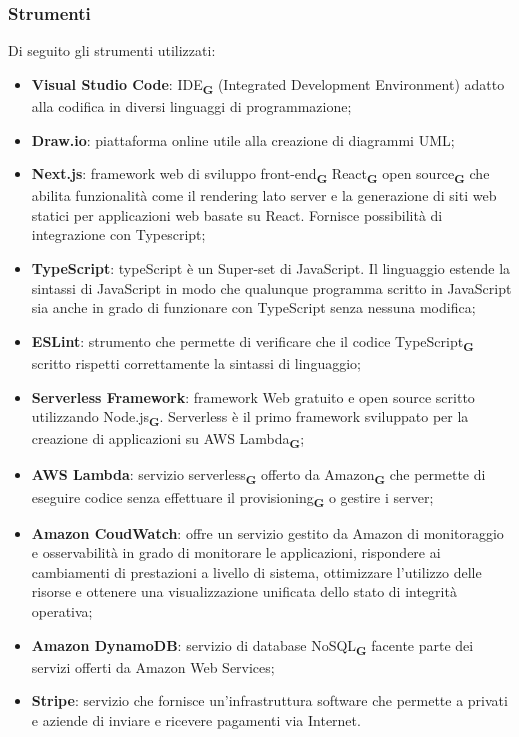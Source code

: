 \subsubsection{Strumenti}
Di seguito gli strumenti utilizzati:
\begin{itemize}
    \item \textbf{Visual Studio Code}: IDE\textsubscript{\textbf{G}} (Integrated Development Environment) adatto alla codifica in diversi linguaggi di programmazione;
    \item \textbf{Draw.io}: piattaforma online utile alla creazione di diagrammi UML;
    \item \textbf{Next.js}: framework web di sviluppo front-end\textsubscript{\textbf{G}} React\textsubscript{\textbf{G}} open source\textsubscript{\textbf{G}} che abilita funzionalità come il rendering lato server e la generazione di siti web statici per applicazioni web basate su React. Fornisce possibilità di integrazione con Typescript;
    \item \textbf{TypeScript}: typeScript è un Super-set di JavaScript. Il linguaggio estende la sintassi di JavaScript in modo che qualunque programma scritto in JavaScript sia anche in grado di funzionare con TypeScript senza nessuna modifica;
    \item \textbf{ESLint}: strumento che permette di verificare che il codice TypeScript\textsubscript{\textbf{G}} scritto rispetti correttamente la sintassi di linguaggio;
    \item \textbf{Serverless Framework}: framework Web gratuito e open source scritto utilizzando Node.js\textsubscript{\textbf{G}}. Serverless è il primo framework sviluppato per la creazione di applicazioni su AWS Lambda\textsubscript{\textbf{G}};
    \item \textbf{AWS Lambda}: servizio serverless\textsubscript{\textbf{G}} offerto da Amazon\textsubscript{\textbf{G}} che permette di eseguire codice senza effettuare il provisioning\textsubscript{\textbf{G}} o gestire i server;
    \item \textbf{Amazon CoudWatch}: offre un servizio gestito da Amazon di monitoraggio e osservabilità in grado di monitorare le applicazioni, rispondere ai cambiamenti di prestazioni a livello di sistema, ottimizzare l'utilizzo delle risorse e ottenere una visualizzazione unificata dello stato di integrità operativa;
    \item \textbf{Amazon DynamoDB}: servizio di database NoSQL\textsubscript{\textbf{G}} facente parte dei servizi offerti da Amazon Web Services;
    \item \textbf{Stripe}: servizio che fornisce un'infrastruttura software che permette a privati e aziende di inviare e ricevere pagamenti via Internet.
\end{itemize}